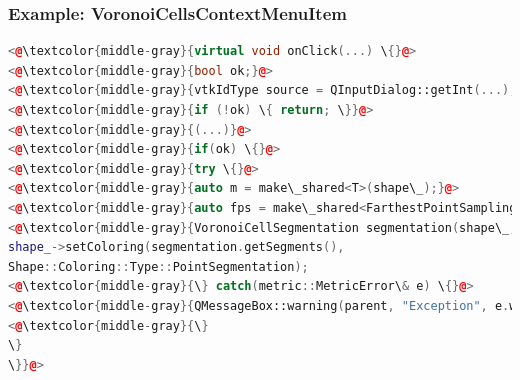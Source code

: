 \documentclass[compress]{beamer}
\begin{document}
\begin{frame}[fragile]
\frametitle{Example: VoronoiCellsContextMenuItem}

\begin{lstlisting}[language=C++, numbers=none]
<@\textcolor{middle-gray}{virtual void onClick(...) \{}@>
<@\textcolor{middle-gray}{bool ok;}@>
<@\textcolor{middle-gray}{vtkIdType source = QInputDialog::getInt(...);}@>
<@\textcolor{middle-gray}{if (!ok) \{ return; \}}@>
<@\textcolor{middle-gray}{(...)}@>
<@\textcolor{middle-gray}{if(ok) \{}@>
<@\textcolor{middle-gray}{try \{}@>
<@\textcolor{middle-gray}{auto m = make\_shared<T>(shape\_);}@>
<@\textcolor{middle-gray}{auto fps = make\_shared<FarthestPointSampling>(shape\_, m, source, numberOfSegments);}@>
<@\textcolor{middle-gray}{VoronoiCellSegmentation segmentation(shape\_, m, fps);}@>
shape_->setColoring(segmentation.getSegments(),
Shape::Coloring::Type::PointSegmentation);
<@\textcolor{middle-gray}{\} catch(metric::MetricError\& e) \{}@>
<@\textcolor{middle-gray}{QMessageBox::warning(parent, "Exception", e.what());}@>
<@\textcolor{middle-gray}{\}
\}
\}}@>
\end{lstlisting}

\end{frame}
\end{document}
